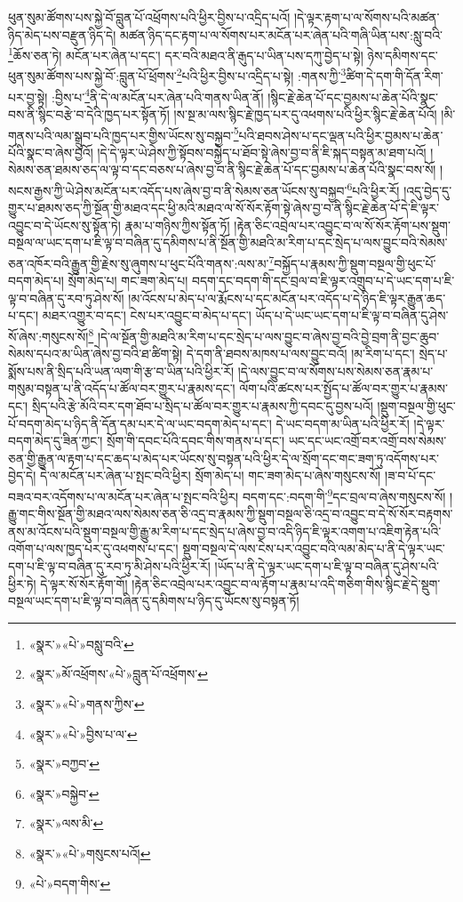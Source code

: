 ཕུན་སུམ་ཚོགས་པས་སྐྱེ་བོ་བླུན་པོ་འཕྲོགས་པའི་ཕྱིར་བྱིས་པ་འདྲིད་པའོ། །དེ་ལྟར་རྟག་པ་ལ་སོགས་པའི་མཚན་ཉིད་མེད་པས་བརྫུན་ཉིད་དེ། མཚན་ཉིད་དང་རྟག་པ་ལ་སོགས་པར་མངོན་པར་ཞེན་པའི་གཞི་ཡིན་པས་:སླུ་བའི་\footnote{«སྣར་»«པེ་»བསླུ་བའི་}ཆོས་ཅན་ཏེ། མངོན་པར་ཞེན་པ་དང་། དར་བའི་མཐའ་ནི་རྒུད་པ་ཡིན་པས་དཀུ་བྱེད་པ་སྟེ། ཉེས་དམིགས་དང་ཕུན་སུམ་ཚོགས་པས་སྐྱེ་བོ་:བླུན་པོ་ཕྲོགས་\footnote{«སྣར་»མོ་འཕྲོགས་«པེ་»བླུན་པོ་འཕྲོགས་}པའི་ཕྱིར་བྱིས་པ་འདྲིད་པ་སྟེ། :གནས་ཀྱི་\footnote{«སྣར་»«པེ་»གནས་ཀྱིས་}ཚིག་དེ་དག་གི་དོན་རིག་པར་བྱ་སྟེ། :བྱིས་པ་\footnote{«སྣར་»«པེ་»བྱིས་པ་ལ་}ནི་དེ་ལ་མངོན་པར་ཞེན་པའི་གནས་ཡིན་ནོ། །སྙིང་རྗེ་ཆེན་པོ་དང་བྱམས་པ་ཆེན་པོའི་སྣང་བས་ནི་སྙིང་བརྩེ་བ་དེའི་ཁྱད་པར་སྟོན་ཏོ། །ས་སྔ་མ་ལས་སྙིང་རྗེ་ཁྱད་པར་དུ་འཕགས་པའི་ཕྱིར་སྙིང་རྗེ་ཆེན་པོའོ། །མི་གནས་པའི་ལམ་སྒྲུབ་པའི་ཁྱད་པར་གྱིས་ཡོངས་སུ་བསྐྱབ་\footnote{«སྣར་»བཀྱབ་}པའི་ཐབས་ཤེས་པ་དང་ལྡན་པའི་ཕྱིར་བྱམས་པ་ཆེན་པོའི་སྣང་བ་ཞེས་བྱའོ། །དེ་དེ་ལྟར་ཡེ་ཤེས་ཀྱི་སྟོབས་བསྐྱེད་པ་ཐོབ་སྟེ་ཞེས་བྱ་བ་ནི་ཇི་སྐད་བསྟན་མ་ཐག་པའོ། །སེམས་ཅན་ཐམས་ཅད་ལ་ལྟ་བ་དང་བཅས་པ་ཞེས་བྱ་བ་ནི་སྙིང་རྗེ་ཆེན་པོ་དང་བྱམས་པ་ཆེན་པོའི་སྣང་བས་སོ། །སངས་རྒྱས་ཀྱི་ཡེ་ཤེས་མངོན་པར་འདོད་པས་ཞེས་བྱ་བ་ནི་སེམས་ཅན་ཡོངས་སུ་བསྐྱབ་\footnote{«སྣར་»བསྐྱེབ་}པའི་ཕྱིར་རོ། །འདུ་བྱེད་དུ་གྱུར་པ་ཐམས་ཅད་ཀྱི་སྔོན་གྱི་མཐའ་དང་ཕྱི་མའི་མཐའ་ལ་སོ་སོར་རྟོག་སྟེ་ཞེས་བྱ་བ་ནི་སྙིང་རྗེ་ཆེན་པོ་དེ་ཇི་ལྟར་འབྱུང་བ་དེ་ཡོངས་སུ་སྟོན་ཏེ། རྣམ་པ་གཉིས་ཀྱིས་སྟོན་ཏོ། །རྟེན་ཅིང་འབྲེལ་པར་འབྱུང་བ་ལ་སོ་སོར་རྟོག་པས་སྡུག་བསྔལ་ལ་ཡང་དག་པ་ཇི་ལྟ་བ་བཞིན་དུ་དམིགས་པ་ནི་སྔོན་གྱི་མཐའི་མ་རིག་པ་དང་སྲེད་པ་ལས་བྱུང་བའི་སེམས་ཅན་འཁོར་བའི་རྒྱུན་གྱི་རྗེས་སུ་ཞུགས་པ་ཕུང་པོའི་གནས་:ལས་མ་\footnote{«སྣར་»ལས་མི་}བསྐྱོད་པ་རྣམས་ཀྱི་སྡུག་བསྔལ་གྱི་ཕུང་པོ་བདག་མེད་པ། སྲོག་མེད་པ། གང་ཟག་མེད་པ། བདག་དང་བདག་གི་དང་བྲལ་བ་ཇི་ལྟར་འགྲུབ་པ་དེ་ཡང་དག་པ་ཇི་ལྟ་བ་བཞིན་དུ་རབ་ཏུ་ཤེས་སོ། །མ་འོངས་པ་མེད་པ་ལ་རྨོངས་པ་དང་མངོན་པར་འདོད་པ་དེ་ཉིད་ཇི་ལྟར་རྒྱུན་ཆད་པ་དང་། མཐར་འགྱུར་བ་དང་། ངེས་པར་འབྱུང་བ་མེད་པ་དང་། ཡོད་པ་དེ་ཡང་ཡང་དག་པ་ཇི་ལྟ་བ་བཞིན་དུ་ཤེས་སོ་ཞེས་:གསུངས་སོ།\footnote{«སྣར་»«པེ་»གསུངས་པའོ།} །དེ་ལ་སྔོན་གྱི་མཐའི་མ་རིག་པ་དང་སྲེད་པ་ལས་བྱུང་བ་ཞེས་བྱ་བའི་བྱེ་བྲག་ནི་བྱང་ཆུབ་སེམས་དཔའ་མ་ཡིན་ཞེས་བྱ་བའི་ཐ་ཚིག་སྟེ། དེ་དག་ནི་ཐབས་མཁས་པ་ལས་བྱུང་བའོ། །མ་རིག་པ་དང་། སྲེད་པ་སྨོས་པས་ནི་སྲིད་པའི་ཡན་ལག་གི་རྩ་བ་ཡིན་པའི་ཕྱིར་རོ། །དེ་ལས་བྱུང་བ་ལ་སོགས་པས་སེམས་ཅན་རྣམ་པ་གསུམ་བསྟན་པ་ནི་འདོད་པ་ཚོལ་བར་གྱུར་པ་རྣམས་དང་། ལོག་པའི་ཚངས་པར་སྤྱོད་པ་ཚོལ་བར་གྱུར་པ་རྣམས་དང་། སྲིད་པའི་རྩེ་མོའི་བར་དག་ཐོབ་པ་སྲིད་པ་ཚོལ་བར་གྱུར་པ་རྣམས་ཀྱི་དབང་དུ་བྱས་པའོ། །སྡུག་བསྔལ་གྱི་ཕུང་པོ་བདག་མེད་པ་ཉིད་ནི་དོན་དམ་པར་དེ་ལ་ཡང་བདག་མེད་པ་དང་། དེ་ཡང་བདག་མ་ཡིན་པའི་ཕྱིར་རོ། །དེ་ལྟར་བདག་མེད་དུ་ཟིན་ཀྱང་། སྲོག་གི་དབང་པོའི་དབང་གིས་གནས་པ་དང་། ཡང་དང་ཡང་འགྲོ་བར་འགྲོ་བས་སེམས་ཅན་གྱི་རྒྱུན་ལ་རྟག་པ་དང་ཆད་པ་མེད་པར་ཡོངས་སུ་བསྟན་པའི་ཕྱིར་དེ་ལ་སྲོག་དང་གང་ཟག་ཏུ་འདོགས་པར་བྱེད་དེ། དེ་ལ་མངོན་པར་ཞེན་པ་སྤང་བའི་ཕྱིར། སྲོག་མེད་པ། གང་ཟག་མེད་པ་ཞེས་གསུངས་སོ། །ཟ་བ་པོ་དང་བཟའ་བར་འདོགས་པ་ལ་མངོན་པར་ཞེན་པ་སྤང་བའི་ཕྱིར། བདག་དང་:བདག་གི་\footnote{«པེ་»བདག་གིས་}དང་བྲལ་བ་ཞེས་གསུངས་སོ། །རྒྱུ་གང་གིས་སྔོན་གྱི་མཐའ་ལས་སེམས་ཅན་ཅི་འདྲ་བ་རྣམས་ཀྱི་སྡུག་བསྔལ་ཅི་འདྲ་བ་འབྱུང་བ་དེ་སོ་སོར་བརྟགས་ནས་མ་འོངས་པའི་སྡུག་བསྔལ་གྱི་རྒྱུ་མ་རིག་པ་དང་སྲེད་པ་ཞེས་བྱ་བ་འདི་ཉིད་ཇི་ལྟར་འགག་པ་འཇིག་རྟེན་པའི་འགོག་པ་ལས་ཁྱད་པར་དུ་འཕགས་པ་དང་། སྡུག་བསྔལ་དེ་ལས་ངེས་པར་འབྱུང་བའི་ལམ་མེད་པ་ནི་དེ་ལྟར་ཡང་དག་པ་ཇི་ལྟ་བ་བཞིན་དུ་རབ་ཏུ་མི་ཤེས་པའི་ཕྱིར་རོ། །ཡོད་པ་ནི་དེ་ལྟར་ཡང་དག་པ་ཇི་ལྟ་བ་བཞིན་དུ་ཤེས་པའི་ཕྱིར་ཏེ། དེ་ལྟར་སོ་སོར་རྟོག་གོ། །རྟེན་ཅིང་འབྲེལ་པར་འབྱུང་བ་ལ་རྟོག་པ་རྣམ་པ་འདི་གཅིག་གིས་སྙིང་རྗེ་དེ་སྡུག་བསྔལ་ཡང་དག་པ་ཇི་ལྟ་བ་བཞིན་དུ་དམིགས་པ་ཉིད་དུ་ཡོངས་སུ་བསྟན་ཏོ། 